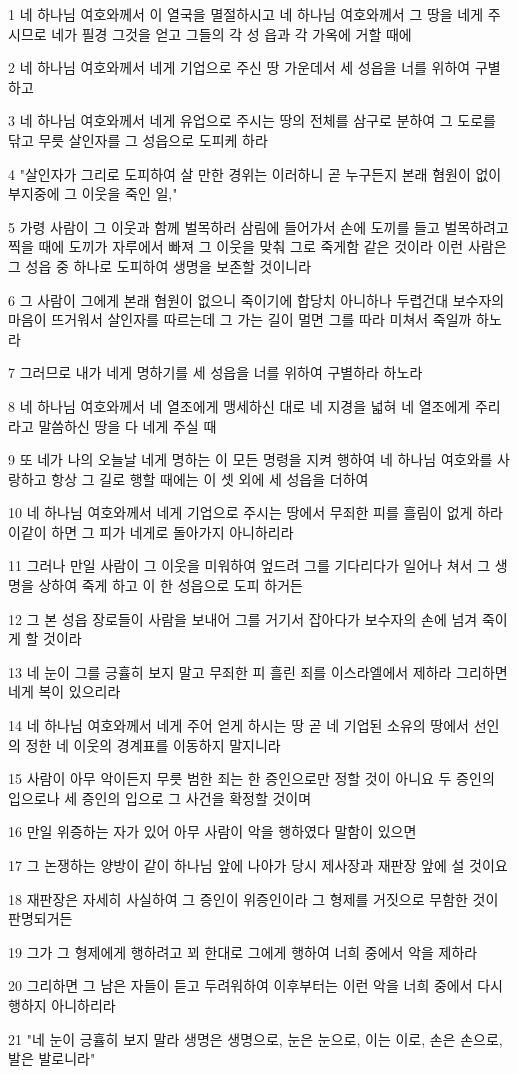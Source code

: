 \par 1 네 하나님 여호와께서 이 열국을 멸절하시고 네 하나님 여호와께서 그 땅을 네게 주시므로 네가 필경 그것을 얻고 그들의 각 성 읍과 각 가옥에 거할 때에
\par 2 네 하나님 여호와께서 네게 기업으로 주신 땅 가운데서 세 성읍을 너를 위하여 구별하고
\par 3 네 하나님 여호와께서 네게 유업으로 주시는 땅의 전체를 삼구로 분하여 그 도로를 닦고 무릇 살인자를 그 성읍으로 도피케 하라
\par 4 "살인자가 그리로 도피하여 살 만한 경위는 이러하니 곧 누구든지 본래 혐원이 없이 부지중에 그 이웃을 죽인 일,"
\par 5 가령 사람이 그 이웃과 함께 벌목하러 삼림에 들어가서 손에 도끼를 들고 벌목하려고 찍을 때에 도끼가 자루에서 빠져 그 이웃을 맞춰 그로 죽게함 같은 것이라 이런 사람은 그 성읍 중 하나로 도피하여 생명을 보존할 것이니라
\par 6 그 사람이 그에게 본래 혐원이 없으니 죽이기에 합당치 아니하나 두렵건대 보수자의 마음이 뜨거워서 살인자를 따르는데 그 가는 길이 멀면 그를 따라 미쳐서 죽일까 하노라
\par 7 그러므로 내가 네게 명하기를 세 성읍을 너를 위하여 구별하라 하노라
\par 8 네 하나님 여호와께서 네 열조에게 맹세하신 대로 네 지경을 넓혀 네 열조에게 주리라고 말씀하신 땅을 다 네게 주실 때
\par 9 또 네가 나의 오늘날 네게 명하는 이 모든 명령을 지켜 행하여 네 하나님 여호와를 사랑하고 항상 그 길로 행할 때에는 이 셋 외에 세 성읍을 더하여
\par 10 네 하나님 여호와께서 네게 기업으로 주시는 땅에서 무죄한 피를 흘림이 없게 하라 이같이 하면 그 피가 네게로 돌아가지 아니하리라
\par 11 그러나 만일 사람이 그 이웃을 미워하여 엎드려 그를 기다리다가 일어나 쳐서 그 생명을 상하여 죽게 하고 이 한 성읍으로 도피 하거든
\par 12 그 본 성읍 장로들이 사람을 보내어 그를 거기서 잡아다가 보수자의 손에 넘겨 죽이게 할 것이라
\par 13 네 눈이 그를 긍휼히 보지 말고 무죄한 피 흘린 죄를 이스라엘에서 제하라 그리하면 네게 복이 있으리라
\par 14 네 하나님 여호와께서 네게 주어 얻게 하시는 땅 곧 네 기업된 소유의 땅에서 선인의 정한 네 이웃의 경계표를 이동하지 말지니라
\par 15 사람이 아무 악이든지 무릇 범한 죄는 한 증인으로만 정할 것이 아니요 두 증인의 입으로나 세 증인의 입으로 그 사건을 확정할 것이며
\par 16 만일 위증하는 자가 있어 아무 사람이 악을 행하였다 말함이 있으면
\par 17 그 논쟁하는 양방이 같이 하나님 앞에 나아가 당시 제사장과 재판장 앞에 설 것이요
\par 18 재판장은 자세히 사실하여 그 증인이 위증인이라 그 형제를 거짓으로 무함한 것이 판명되거든
\par 19 그가 그 형제에게 행하려고 꾀 한대로 그에게 행하여 너희 중에서 악을 제하라
\par 20 그리하면 그 남은 자들이 듣고 두려워하여 이후부터는 이런 악을 너희 중에서 다시 행하지 아니하리라
\par 21 "네 눈이 긍휼히 보지 말라 생명은 생명으로, 눈은 눈으로, 이는 이로, 손은 손으로, 발은 발로니라"

